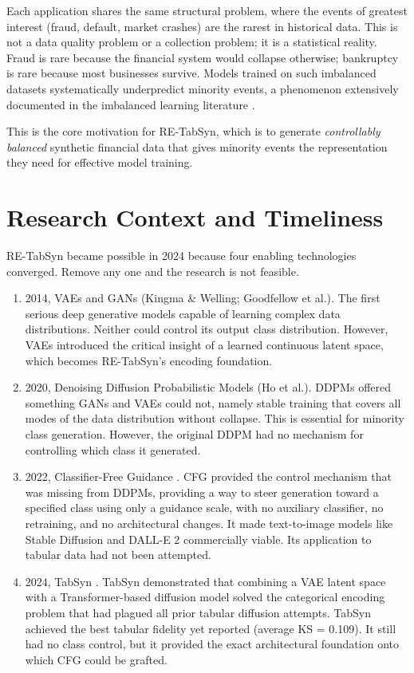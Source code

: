 Each application shares the same structural problem, where the events of greatest interest (fraud, default, market crashes) are the rarest in historical data. This is not a data quality problem or a collection problem; it is a statistical reality. Fraud is rare because the financial system would collapse otherwise; bankruptcy is rare because most businesses survive. Models trained on such imbalanced datasets systematically underpredict minority events, a phenomenon extensively documented in the imbalanced learning literature \cite{he2009imbalanced}.

This is the core motivation for RE-TabSyn, which is to generate \textit{controllably balanced} synthetic financial data that gives minority events the representation they need for effective model training.

\section{Research Context and Timeliness}

RE-TabSyn became possible in 2024 because four enabling technologies converged. Remove any one and the research is not feasible.

\begin{enumerate}
    \item 2014, VAEs and GANs (Kingma \& Welling; Goodfellow et al.). The first serious deep generative models capable of learning complex data distributions. Neither could control its output class distribution. However, VAEs introduced the critical insight of a learned continuous latent space, which becomes RE-TabSyn's encoding foundation.

    \item 2020, Denoising Diffusion Probabilistic Models (Ho et al.). DDPMs offered something GANs and VAEs could not, namely stable training that covers all modes of the data distribution without collapse. This is essential for minority class generation. However, the original DDPM had no mechanism for controlling which class it generated.

    \item 2022, Classifier-Free Guidance \cite{ho2022cfg}. CFG provided the control mechanism that was missing from DDPMs, providing a way to steer generation toward a specified class using only a guidance scale, with no auxiliary classifier, no retraining, and no architectural changes. It made text-to-image models like Stable Diffusion and DALL-E 2 commercially viable. Its application to tabular data had not been attempted.

    \item 2024, TabSyn \cite{zhang2024tabsyn}. TabSyn demonstrated that combining a VAE latent space with a Transformer-based diffusion model solved the categorical encoding problem that had plagued all prior tabular diffusion attempts. TabSyn achieved the best tabular fidelity yet reported (average KS = 0.109). It still had no class control, but it provided the exact architectural foundation onto which CFG could be grafted.
\end{enumerate}

